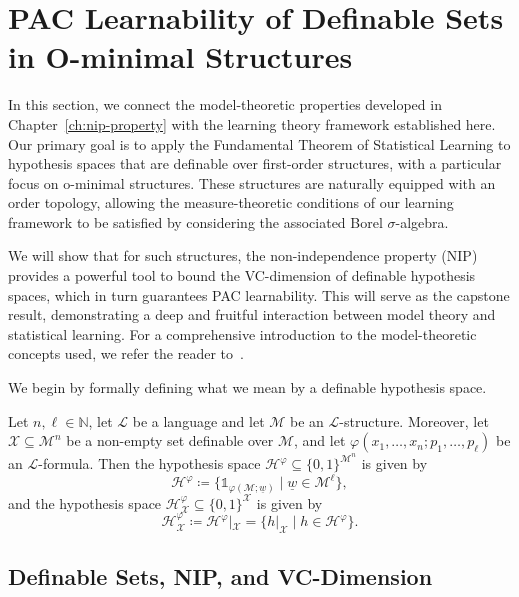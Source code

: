\section{PAC Learnability of Definable Sets in O-minimal Structures}

In this section, we connect the model-theoretic properties developed in Chapter~\ref{ch:nip-property} with the learning theory framework established here. Our primary goal is to apply the Fundamental Theorem of Statistical Learning to hypothesis spaces that are definable over first-order structures, with a particular focus on o-minimal structures. These structures are naturally equipped with an order topology, allowing the measure-theoretic conditions of our learning framework to be satisfied by considering the associated Borel $\sigma$-algebra.

We will show that for such structures, the non-independence property (NIP) provides a powerful tool to bound the VC-dimension of definable hypothesis spaces, which in turn guarantees PAC learnability. This will serve as the capstone result, demonstrating a deep and fruitful interaction between model theory and statistical learning. For a comprehensive introduction to the model-theoretic concepts used, we refer the reader to~\cite{Marker2002}.

We begin by formally defining what we mean by a definable hypothesis space.

\begin{definition}
    \label{def:definable-hypothesis-space}
    Let $n, \ell \in \mathbb{N}$, let $\mathcal{L}$ be a language and let $\mathcal{M}$ be an $\mathcal{L}$-structure. Moreover, let $\mathcal{X} \subseteq \mathcal{M}^n$ be a non-empty set definable over $\mathcal{M}$, and let $\varphi(x_1, \dots, x_n; p_1, \dots, p_\ell)$ be an $\mathcal{L}$-formula. Then the hypothesis space $\mathcal{H}^\varphi \subseteq \{0,1\}^{\mathcal{M}^n}$ is given by
    \[
        \mathcal{H}^\varphi \coloneqq \{ \mathds{1}_{\varphi(\mathcal{M}; \underline{w})} \mid \underline{w} \in \mathcal{M}^\ell \},
    \]
    and the hypothesis space $\mathcal{H}_\mathcal{X}^\varphi \subseteq \{0,1\}^\mathcal{X}$ is given by
    \[
        \mathcal{H}_\mathcal{X}^\varphi \coloneqq \mathcal{H}^\varphi|_\mathcal{X} = \{ h|_\mathcal{X} \mid h \in \mathcal{H}^\varphi \}.
    \]
\end{definition}

\subsection{Definable Sets, NIP, and VC-Dimension}

